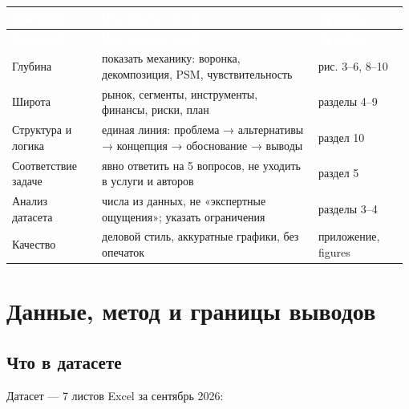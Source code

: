 \documentclass[10pt,a4paper]{article}
\begin{document}
\begingroup
\small
\setlength{\tabcolsep}{3pt}
\renewcommand{\arraystretch}{1.12}
\begin{longtable}{@{}>{\raggedright\arraybackslash}p{0.2206\linewidth}>{\raggedright\arraybackslash}p{0.5341\linewidth}>{\raggedright\arraybackslash}p{0.2206\linewidth}@{}}
\rowcolor{blue}
\textcolor{white}{\textbf{Критерий}} & \textcolor{white}{\textbf{Что делать в deck}} & \textcolor{white}{\textbf{Артефакт}} \\
\endfirsthead
\rowcolor{blue}
\textcolor{white}{\textbf{Критерий}} & \textcolor{white}{\textbf{Что делать в deck}} & \textcolor{white}{\textbf{Артефакт}} \\
\endhead
\hline
Глубина & показать механику: воронка, декомпозиция, PSM, чувствительность & рис. 3–6, 8–10 \\
Широта & рынок, сегменты, инструменты, финансы, риски, план & разделы 4–9 \\
Структура и логика & единая линия: проблема → альтернативы → концепция → обоснование → выводы & раздел 10 \\
Соответствие задаче & явно ответить на 5 вопросов, не уходить в услуги и авторов & раздел 5 \\
Анализ датасета & числа из данных, не «экспертные ощущения»; указать ограничения & разделы 3–4 \\
Качество & деловой стиль, аккуратные графики, без опечаток & приложение, figures \\
\hline
\end{longtable}
\endgroup
\vspace{4pt}

\clearpage

\section{Данные, метод и границы выводов}

\subsection{Что в датасете}

Датасет — 7 листов Excel за сентябрь 2026:\par
\end{document}
